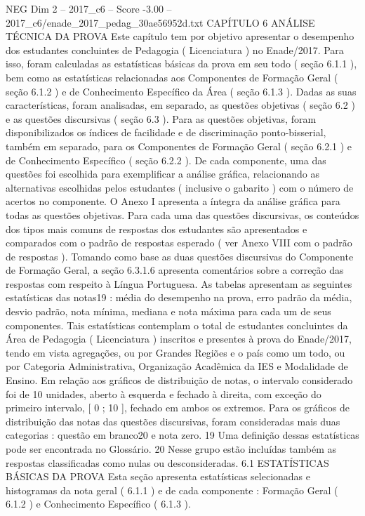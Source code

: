 \begin{textsample}{NEG Dim 2 – 2017\_c6 – Score -3.00 – 2017\_c6/enade\_2017\_pedag\_30ae56952d.txt}  \label{ex:f2_neg_164}
CAPÍTULO 6 ANÁLISE TÉCNICA DA PROVA Este capítulo tem por objetivo apresentar o desempenho dos estudantes concluintes de Pedagogia ( Licenciatura ) no Enade/2017.
Para isso, foram calculadas as estatísticas básicas da prova em seu todo ( seção 6.1.1 ), bem como as estatísticas relacionadas aos Componentes de Formação Geral ( seção 6.1.2 ) e de Conhecimento Específico da Área ( seção 6.1.3 ).
Dadas as suas características, foram analisadas, em separado, as questões objetivas ( seção 6.2 ) e as questões discursivas ( seção 6.3 ).
Para as questões objetivas, foram disponibilizados os índices de facilidade e de discriminação ponto-bisserial, também em separado, para os Componentes de Formação Geral ( seção 6.2.1 ) e de Conhecimento Específico ( seção 6.2.2 ).
De cada componente, uma das questões foi escolhida para exemplificar a análise gráfica, relacionando as alternativas escolhidas pelos estudantes ( inclusive o gabarito ) com o número de acertos no componente.
O Anexo I apresenta a íntegra da análise gráfica para todas as questões objetivas.
Para cada uma das questões discursivas, os conteúdos dos tipos mais comuns de respostas dos estudantes são apresentados e comparados com o padrão de respostas esperado ( ver Anexo VIII com o padrão de respostas ).
Tomando como base as duas questões discursivas do Componente de Formação Geral, a seção 6.3.1.6 apresenta comentários sobre a correção das respostas com respeito à Língua Portuguesa.
As tabelas apresentam as seguintes estatísticas das notas19 : média do desempenho na prova, erro padrão da média, desvio padrão, nota mínima, mediana e nota máxima para cada um de seus componentes.
Tais estatísticas contemplam o total de estudantes concluintes da Área de Pedagogia ( Licenciatura ) inscritos e presentes à prova do Enade/2017, tendo em vista agregações, ou por Grandes Regiões e o país como um todo, ou por Categoria Administrativa, Organização Acadêmica da IES e Modalidade de Ensino.
Em relação aos gráficos de distribuição de notas, o intervalo considerado foi de 10 unidades, aberto à esquerda e fechado à direita, com exceção do primeiro intervalo, [ 0 ; 10 ], fechado em ambos os extremos.
Para os gráficos de distribuição das notas das questões discursivas, foram consideradas mais duas categorias : questão em branco20 e nota zero. 19 Uma definição dessas estatísticas pode ser encontrada no Glossário. 20 Nesse grupo estão incluídas também as respostas classificadas como nulas ou desconsideradas. 6.1 ESTATÍSTICAS BÁSICAS DA PROVA Esta seção apresenta estatísticas selecionadas e histogramas da nota geral ( 6.1.1 ) e de cada componente : Formação Geral ( 6.1.2 ) e Conhecimento Específico ( 6.1.3 ).

\end{textsample}
